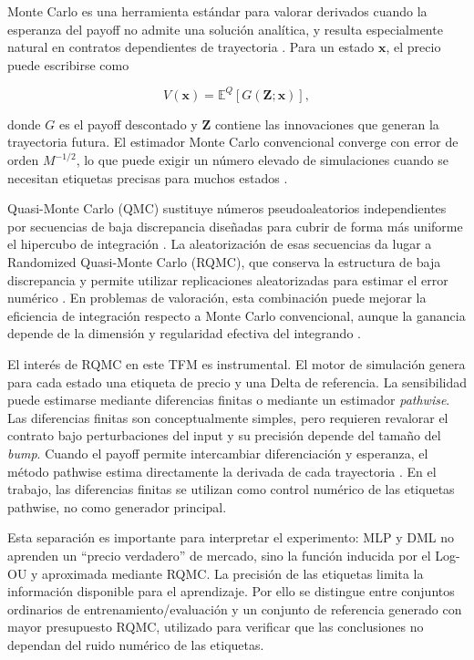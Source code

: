 Monte Carlo es una herramienta estándar para valorar derivados cuando la esperanza
del payoff no admite una solución analítica, y resulta especialmente natural en
contratos dependientes de trayectoria
\cite{boyle1977montecarlo,glasserman_2004,uned_mod7_2026}. Para un estado
$\mathbf{x}$, el precio puede escribirse como

\begin{equation}
    V(\mathbf{x})
    =
    \mathbb E^{Q}\!\left[G(\mathbf Z;\mathbf{x})\right],
    \label{eq:mc_expectation_literature}
\end{equation}

donde $G$ es el payoff descontado y $\mathbf Z$ contiene las innovaciones que
generan la trayectoria futura. El estimador Monte Carlo convencional converge con
error de orden $M^{-1/2}$, lo que puede exigir un número elevado de simulaciones
cuando se necesitan etiquetas precisas para muchos estados
\cite{glasserman_2004}.

Quasi-Monte Carlo (QMC) sustituye números pseudoaleatorios independientes por
secuencias de baja discrepancia diseñadas para cubrir de forma más uniforme el
hipercubo de integración \cite{sobol_1967,caflisch_1998}. La aleatorización de esas
secuencias da lugar a Randomized Quasi-Monte Carlo (RQMC), que conserva la
estructura de baja discrepancia y permite utilizar replicaciones aleatorizadas para
estimar el error numérico \cite{owen_1997}. En problemas de valoración, esta
combinación puede mejorar la eficiencia de integración respecto a Monte Carlo
convencional, aunque la ganancia depende de la dimensión y regularidad efectiva del
integrando \cite{caflisch_1998,glasserman_2004}.

El interés de RQMC en este TFM es instrumental. El motor de simulación genera para
cada estado una etiqueta de precio y una Delta de referencia. La sensibilidad puede
estimarse mediante diferencias finitas o mediante un estimador \textit{pathwise}.
Las diferencias finitas son conceptualmente simples, pero requieren revalorar el
contrato bajo perturbaciones del input y su precisión depende del tamaño del
\textit{bump}. Cuando el payoff permite intercambiar diferenciación y esperanza, el
método pathwise estima directamente la derivada de cada trayectoria
\cite{broadie_glasserman_1996,glasserman_2004}. En el trabajo, las diferencias
finitas se utilizan como control numérico de las etiquetas pathwise, no como
generador principal.

Esta separación es importante para interpretar el experimento: MLP y DML no
aprenden un ``precio verdadero'' de mercado, sino la función inducida por el Log-OU
y aproximada mediante RQMC. La precisión de las etiquetas limita la información
disponible para el aprendizaje. Por ello se distingue entre conjuntos ordinarios de
entrenamiento/evaluación y un conjunto de referencia generado con mayor presupuesto
RQMC, utilizado para verificar que las conclusiones no dependan del ruido numérico
de las etiquetas.

